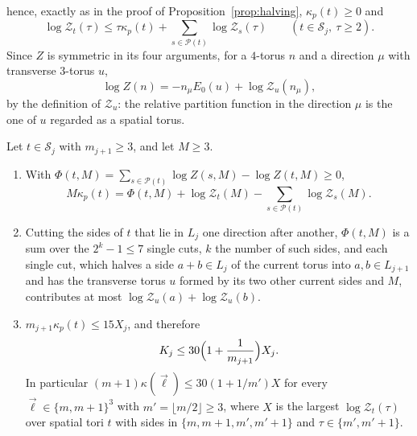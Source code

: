 hence, exactly as in the proof of Proposition~\ref{prop:halving},
$\kappa_p(t)\ge0$ and
\begin{equation}\label{eq:partialhalving}
\log\mathcal Z_t(\tau)\le\tau\kappa_p(t)+\sum_{s\in\mathcal P(t)}\log
\mathcal Z_s(\tau)\qquad(t\in\mathcal S_j,\ \tau\ge2).
\end{equation}
Since $Z$ is symmetric in its four arguments, for a $4$-torus $n$ and a
direction $\mu$ with transverse $3$-torus $u$,
\begin{equation}\label{eq:transverse}
\log Z(n)=-n_\mu E_0(u)+\log\mathcal Z_u(n_\mu),
\end{equation}
by the definition of $\mathcal Z_u$: the relative partition function in the
direction $\mu$ is the one of $u$ regarded as a spatial torus.

\begin{lemma}\label{lem:dual}
Let $t\in\mathcal S_j$ with $m_{j+1}\ge3$, and let $M\ge3$.
\begin{enumerate}[label=\textup{(\roman*)},leftmargin=*]
\item With $\Phi(t,M)=\sum_{s\in\mathcal P(t)}\log Z(s,M)-\log Z(t,M)\ge0$,
\[
M\kappa_p(t)=\Phi(t,M)+\log\mathcal Z_t(M)-\sum_{s\in\mathcal P(t)}\log
\mathcal Z_s(M).
\]
\item Cutting the sides of $t$ that lie in $L_j$ one direction after another,
$\Phi(t,M)$ is a sum over the $2^k-1\le7$ single cuts, $k$ the number of such
sides, and each single cut, which halves a side $a+b\in L_j$ of the current
torus into $a,b\in L_{j+1}$ and has the transverse torus $u$ formed by its
two other current sides and $M$, contributes at most $\log\mathcal Z_u(a)+
\log\mathcal Z_u(b)$.
\item $m_{j+1}\kappa_p(t)\le15X_j$, and therefore
\[
K_j\le30\Bigl(1+\frac1{m_{j+1}}\Bigr)X_j .
\]
In particular $(m+1)\kappa(\vec\ell)\le30(1+1/m')X$ for every $\vec\ell\in
\{m,m+1\}^3$ with $m'=\lfloor m/2\rfloor\ge3$, where $X$ is the largest
$\log\mathcal Z_t(\tau)$ over spatial tori $t$ with sides in $\{m,m+1,m',
m'+1\}$ and $\tau\in\{m',m'+1\}$.
\end{enumerate}
\end{lemma}

